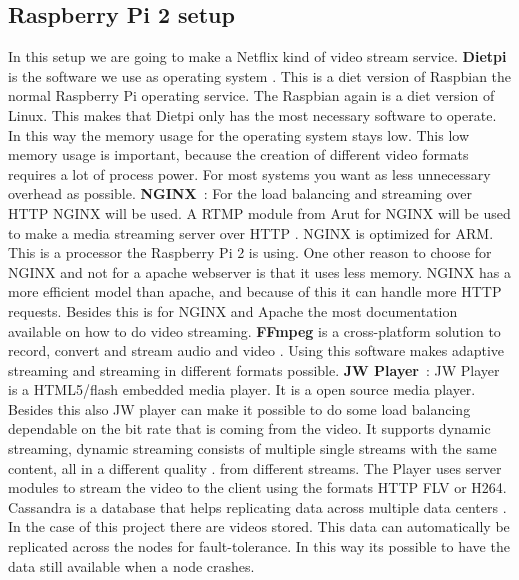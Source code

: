 \documentclass{sig-alternate-br}
\begin{document}
\subsection{Raspberry Pi 2 setup}\label{sec:setup}
In this setup we are going to make a Netflix kind of video stream service. \newline
\textbf{Dietpi} is the software we use as operating system \cite{dietpi}. This is a diet version of Raspbian the normal Raspberry Pi operating service. The Raspbian again is a diet version of Linux. This makes that Dietpi only has the most necessary software to operate. In this way the memory usage for the operating system stays low. This low memory usage is important, because the creation of different video formats requires a lot of process power. For most systems you want as less unnecessary overhead as possible. \newline
\textbf{NGINX}~\cite{nginx}: For the load balancing and streaming over HTTP NGINX will be used. A RTMP module from Arut for NGINX will be used to make a media streaming server over HTTP \cite{arut}. NGINX is optimized for ARM. This is a processor the Raspberry Pi 2 is using. One other reason to choose for NGINX and not for a apache webserver is that it uses less memory. NGINX has a more efficient model than apache, and because of this it can handle more HTTP requests. Besides this is for NGINX and Apache the most documentation available on how to do video streaming. \newline
\textbf{FFmpeg} is a cross-platform solution to record, convert and stream audio and video \cite{ffmpeg}. Using this software makes adaptive streaming and streaming in different formats possible. \newline
\textbf{JW Player}~\cite{jwplayer}: JW Player is a HTML5/flash embedded media player. It is a open source media player. Besides this also JW player can make it possible to do some load balancing dependable on the bit rate that is coming from the video. It supports dynamic streaming, dynamic streaming consists of multiple single streams with the same content, all in a different quality \cite{jwplayer}. from different streams. The Player uses server modules to stream the video to the client using the formats HTTP FLV or H264.\newline
Cassandra is a database that helps replicating data across multiple data centers \cite{cassandra}. In the case of this project there are videos stored. This data can automatically be replicated across the nodes for fault-tolerance. In this way its possible to have the data still available when a node crashes.
\end{document}
